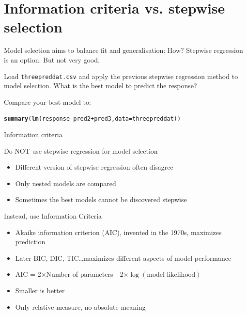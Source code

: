\documentclass[10pt]{beamer}\usepackage[]{graphicx}\usepackage[]{color}
\makeatletter
\newcommand{\hlopt}[1]{\textcolor[rgb]{0,0,0}{#1}}%
\newcommand{\hlstd}[1]{\textcolor[rgb]{0.345,0.345,0.345}{#1}}%
\newcommand{\hlkwc}[1]{\textcolor[rgb]{0.333,0.667,0.333}{#1}}%
\newcommand{\hlkwd}[1]{\textcolor[rgb]{0.737,0.353,0.396}{\textbf{#1}}}%
\newenvironment{kframe}{%
 \def\at@end@of@kframe{}%
 \ifinner\ifhmode%
  \def\at@end@of@kframe{\end{minipage}}%
  \begin{minipage}{\columnwidth}%
 \fi\fi%
 \def\FrameCommand##1{\hskip\@totalleftmargin \hskip-\fboxsep
 \colorbox{shadecolor}{##1}\hskip-\fboxsep
     \hskip-\linewidth \hskip-\@totalleftmargin \hskip\columnwidth}%
 \MakeFramed {\advance\hsize-\width
   \@totalleftmargin\z@ \linewidth\hsize
   \@setminipage}}%
 {\par\unskip\endMakeFramed%
 \at@end@of@kframe}
\newenvironment{knitrout}{}{} %
\makeatother
\begin{document}
\section{Information criteria vs. stepwise selection}

\begin{frame}[fragile]{Model selection aims to balance fit and generalisation: How?}
  Stepwise regression is an option. But not very good.
  

  
Load \texttt{threepreddat.csv} and apply the previous stepwise regression method to model selection. What is the best model to predict the response?




  
\pause
Compare your best model to:
\begin{knitrout}\small
{}\color{fgcolor}\begin{kframe}
\begin{alltt}
\hlkwd{summary}\hlstd{(}\hlkwd{lm}\hlstd{(response} \hlopt{~} \hlstd{pred2} \hlopt{+} \hlstd{pred3,} \hlkwc{data} \hlstd{= threepreddat))}
\end{alltt}
\end{kframe}
\end{knitrout}
  
\end{frame}

\begin{frame}{Information criteria}

\begin{alertblock}{Do NOT use stepwise regression for model selection}
  \begin{itemize}
    \item Different version of stepwise regression often disagree
    \item Only nested models are compared 
    \item Sometimes the best models cannot be discovered stepwise
  \end{itemize}
\end{alertblock}

\pause

\begin{exampleblock}{Instead, use Information Criteria}
  \begin{itemize}[<+->]
    \item Akaike information criterion (AIC), invented in the 1970s, maximizes prediction
    \item Later BIC, DIC, TIC\dots maximizes different aspects of model performance
    \item AIC = 2$\times$Number of parameters - 2$\times \log(\text{model likelihood})$
    \item Smaller is better
    \item Only relative measure, no absolute meaning
  \end{itemize}
\end{exampleblock}

\end{frame}
\end{document}
